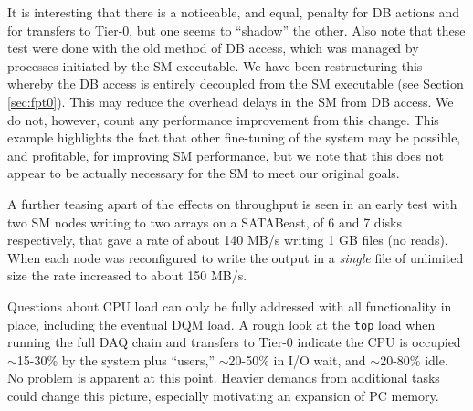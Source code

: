 It is interesting that there is a noticeable, and equal,  penalty for DB actions
and for transfers to Tier-0, but one seems to ``shadow'' the other.
Also note that these test were done with the old method of DB access, which was managed 
by processes initiated by the SM executable. We have been  restructuring this whereby
the DB access is entirely decoupled from the SM executable (see Section \ref{sec:fpt0}).
This may reduce the overhead delays in the SM from DB access.
We do not, however, count any performance improvement from this change.
This example highlights the fact that other fine-tuning of the system may be possible,
and profitable, for improving SM performance, but we note that this does not appear 
to be actually necessary for the SM to meet our original goals.

A further teasing apart of the effects on throughput is seen in an early
test with two SM nodes writing to two arrays on a SATABeast, of 6 and 7 disks respectively,
that gave a rate of about 140 MB/s writing 1 GB files (no reads).
When each node was reconfigured to write the output in a {\it single} file of unlimited
size the rate increased to about  150 MB/s.

Questions about CPU load can only be fully addressed with all functionality
in place, including the eventual DQM load.
A rough look at the \verb+top+ load when running the full DAQ chain and
transfers to Tier-0 indicate the CPU is occupied $\sim$15-30\% by the system plus ``users,''
$\sim$20-50\% in I/O wait, and $\sim$20-80\% idle.
No problem is apparent at this point.
Heavier demands from additional tasks could change this picture, 
especially motivating an expansion of PC memory.

